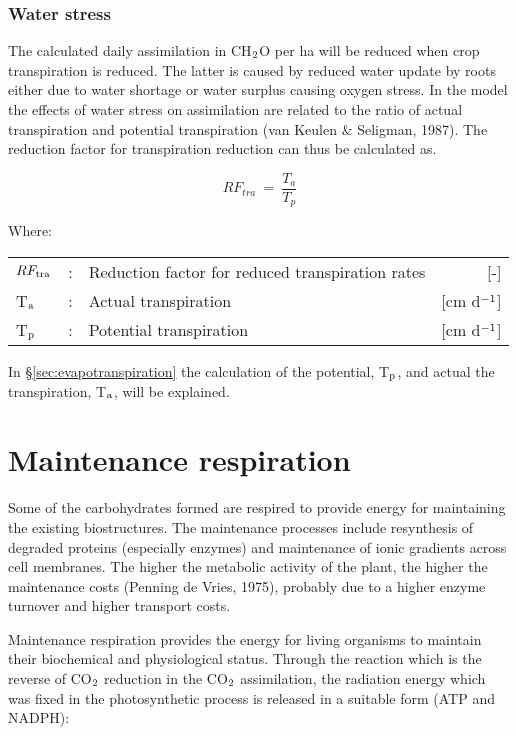 \subsubsection{Water stress}
The calculated daily assimilation in CH$_{{\rm 2}}$O per ha will be reduced when crop transpiration
is reduced. The latter is caused by reduced water update by roots either due to water shortage or water 
surplus causing oxygen stress. In the model the effects of water stress on assimilation are related 
to the ratio of actual transpiration and potential transpiration (van Keulen \& Seligman, 1987).
The reduction factor for transpiration reduction can thus be calculated as.

\begin{equation}
\label{eq:5.37}
RF_{tra} ~=~ {\frac{T _{a} }{T _{p} }}
\end{equation}

Where:\\[5pt]
\begin{tabularx}{\textwidth}{llXr}
	$RF_{{\rm tra}}$ &:& Reduction factor for reduced transpiration rates   & [-]\\
	T$_{{\rm a}}$ &:& Actual transpiration   &     [cm d$^{{\rm -1}}$]\\
	T$_{{\rm p}}$ &:& Potential transpiration   &     [cm d$^{{\rm -1}}$]\\
\end{tabularx}

In \S \ref{sec:evapotranspiration} the calculation of the potential, T$_{{\rm p}}$, and actual 
the transpiration, T$_{{\rm a}}$, will be explained.

\section{Maintenance respiration}

Some of the carbohydrates formed are respired to provide energy for maintaining the
existing biostructures. The maintenance processes include resynthesis of degraded proteins
(especially enzymes) and maintenance of ionic gradients across cell membranes. The
higher the metabolic activity of the plant, the higher the maintenance costs (Penning de
Vries, 1975), probably due to a higher enzyme turnover and higher transport costs.

Maintenance respiration provides the energy for living organisms to maintain their
biochemical and physiological status. Through the reaction which is the reverse of CO$_{{\rm 2}}$
reduction in the CO$_{{\rm 2}}$ assimilation, the radiation energy which was fixed in the
photosynthetic process is released in a suitable form (ATP and NADPH):

